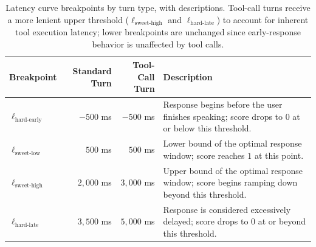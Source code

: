 \begin{table}[h]
\centering
\small
\captionsetup{font=small}
\caption{Latency curve breakpoints by turn type, with descriptions. Tool-call turns receive a more lenient upper threshold ($\ell_{\text{sweet-high}}$ and $\ell_{\text{hard-late}}$) to account for inherent tool execution latency; lower breakpoints are unchanged since early-response behavior is unaffected by tool calls.}
\begin{tabular}{lrrp{2.4in}}
\toprule
\textbf{Breakpoint} & \textbf{Standard Turn} & \textbf{Tool-Call Turn} & \textbf{Description} \\
\midrule
$\ell_{\text{hard-early}}$ & $-500$ ms    & $-500$ ms    & 
Response begins before the user finishes speaking; score drops to $0$ at or below this threshold. \\[4pt]
$\ell_{\text{sweet-low}}$  & $500$ ms     & $500$ ms     & 
Lower bound of the optimal response window; score reaches $1$ at this point. \\[4pt]
$\ell_{\text{sweet-high}}$ & $2{,}000$ ms & $3{,}000$ ms & 
Upper bound of the optimal response window; score begins ramping down beyond this threshold. \\[4pt]
$\ell_{\text{hard-late}}$  & $3{,}500$ ms & $5{,}000$ ms & 
Response is considered excessively delayed; score drops to $0$ at or beyond this threshold. \\
\bottomrule
\end{tabular}
\label{tab:tt-latency}
\end{table}